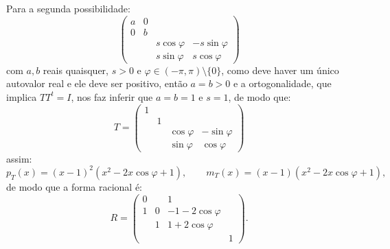 \documentclass[11pt,a4paper]{article}
\begin{document}
{{\task[\pers{b}] Para a segunda possibilidade:
\[
\begin{pmatrix}
a&0&&\\0&b&&\\&&s\cos\varphi&-s\sin\varphi\\&&s\sin\varphi&s\cos\varphi
\end{pmatrix}
\]
com $a,b$ reais quaisquer, $s>0$ e $\varphi\in(-\pi,\pi)\setminus\{0\}$, como deve haver um único autovalor real e ele deve ser positivo, então $a=b>0$ e a ortogonalidade, que implica $TT^t=I$, nos faz inferir que $a=b=1$ e $s=1$, de modo que:
\[
T=\begin{pmatrix}
1&&&\\&1&&\\&&\cos\varphi&-\sin\varphi\\&&\sin\varphi&\cos\varphi
\end{pmatrix}
\]
assim:
\[
p_T(x)=(x-1)^2(x^2-2x\cos\varphi+1),\quad\quad m_T(x)=(x-1)(x^2-2x\cos\varphi+1),
\]
de modo que a forma racional é:
\[
R=\begin{pmatrix}
0&&1&\\1&0&-1-2\cos\varphi&\\&1&1+2\cos\varphi&\\&&&1
\end{pmatrix}.
\]
}
}
\end{document}
